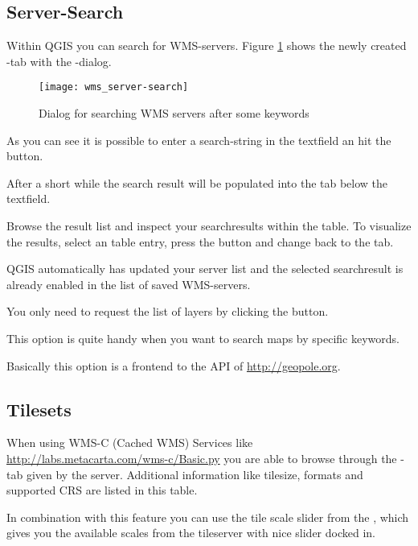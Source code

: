 %
%
\subsection{Server-Search}
\label{sec:serversearch}

Within QGIS you can search for WMS-servers. Figure \ref{fig:searchtab} shows
the newly created -tab with the -dialog.

\begin{figure}[ht]
  \centering
  \texttt{[image: wms\_server-search]}
  	\caption{Dialog for searching WMS servers after some keywords \nixcaption}\label{fig:searchtab}
\end{figure}

As you can see it is possible to enter a search-string in the textfield an
hit the  button.

After a short while the search result will be populated into the tab below
the textfield.

Browse the result list and inspect your searchresults within the table. To
visualize the results, select an table entry, press the  button and change back to the  tab.

QGIS automatically has updated your server list and the selected
searchresult is already enabled in the list of saved WMS-servers.

You only need to request the list of layers by clicking the
 button.

This option is quite handy when you want to search maps by specific
keywords.

Basically this option is a frontend to the API of
\url{http://geopole.org}.

%
%
\subsection{Tilesets}\label{sec:tilesets}

When using WMS-C (Cached WMS) Services like
\url{http://labs.metacarta.com/wms-c/Basic.py} you are able to browse
through the -tab given by the server. Additional information like
tilesize, formats and supported CRS are listed in this table.

In combination with this feature you can use the tile scale slider from
the  \arrow {}, which gives you
the available scales from the tileserver with nice slider docked in.

